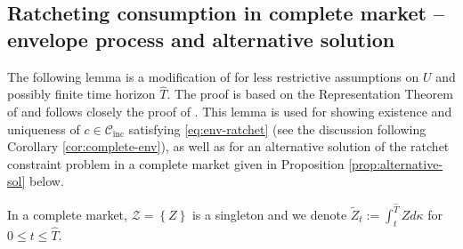 \documentclass[11pt, oneside]{article}   	%
\theoremstyle{plain}
\theoremstyle{definition}
\theoremstyle{remark}
\begin{document}
\begin{appendix}

\section*{Ratcheting consumption in complete market -- envelope process and alternative solution}\label{app:envelope}

The following lemma is a modification of \cite[Lemma A.1]{BK} for less restrictive assumptions on $U$ and possibly finite time horizon $\hat{T}$. The proof is based on the Representation Theorem of \cite{bank-el-karoui} and follows closely the proof of \cite[Lemma A.1]{BK}. This lemma is used for showing existence and uniqueness of $c\in\mathcal{C}_{\text{inc}}$ satisfying \eqref{eq:env-ratchet} (see the discussion following Corollary \ref{cor:complete-env}), as well as for an alternative solution of the ratchet constraint problem in a complete market given in Proposition \ref{prop:alternative-sol} below.

In a complete market, $\mathcal{Z}=\left\{Z\right\}$ is a singleton and we denote $\tilde{Z}_t:=\int_t^{\hat{T}} Zd\kappa$ for $0\leq t\leq \hat{T}$.


\end{appendix}
\end{document}
